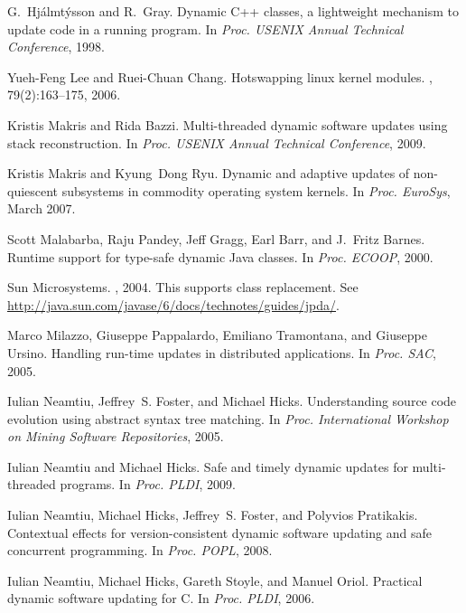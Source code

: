 \documentclass[9pt]{sigplanconf}
\begin{document}
\begin{thebibliography}{10}
G.~Hj\'{a}lmt\'{y}sson and R.~Gray.
\newblock Dynamic {C}++ classes, a lightweight mechanism to update code in a
  running program.
\newblock In {\em Proc. USENIX Annual Technical Conference}, 1998.

Yueh-Feng Lee and Ruei-Chuan Chang.
\newblock Hotswapping linux kernel modules.
, 79(2):163--175, 2006.

Kristis Makris and Rida Bazzi.
\newblock Multi-threaded dynamic software updates using stack reconstruction.
\newblock In {\em Proc. USENIX Annual Technical Conference}, 2009.

Kristis Makris and Kyung~Dong Ryu.
\newblock Dynamic and adaptive updates of non-quiescent subsystems in commodity
  operating system kernels.
\newblock In {\em Proc. EuroSys}, March 2007.

Scott Malabarba, Raju Pandey, Jeff Gragg, Earl Barr, and J.~Fritz Barnes.
\newblock Runtime support for type-safe dynamic {Java} classes.
\newblock In {\em Proc. ECOOP}, 2000.

Sun Microsystems.
, 2004.
\newblock This supports class replacement. See
  \url{http://java.sun.com/javase/6/docs/technotes/guides/jpda/}.

Marco Milazzo, Giuseppe Pappalardo, Emiliano Tramontana, and Giuseppe Ursino.
\newblock Handling run-time updates in distributed applications.
\newblock In {\em Proc. SAC}, 2005.

Iulian Neamtiu, Jeffrey~S. Foster, and Michael Hicks.
\newblock Understanding source code evolution using abstract syntax tree
  matching.
\newblock In {\em Proc. International Workshop on Mining Software
  Repositories}, 2005.

Iulian Neamtiu and Michael Hicks.
\newblock Safe and timely dynamic updates for multi-threaded programs.
\newblock In {\em Proc. PLDI}, 2009.

Iulian Neamtiu, Michael Hicks, Jeffrey~S. Foster, and Polyvios Pratikakis.
\newblock Contextual effects for version-consistent dynamic software updating
  and safe concurrent programming.
\newblock In {\em Proc. POPL}, 2008.

\newpage

Iulian Neamtiu, Michael Hicks, Gareth Stoyle, and Manuel Oriol.
\newblock Practical dynamic software updating for {C}.
\newblock In {\em Proc. PLDI}, 2006.


\end{thebibliography}
\end{document}
